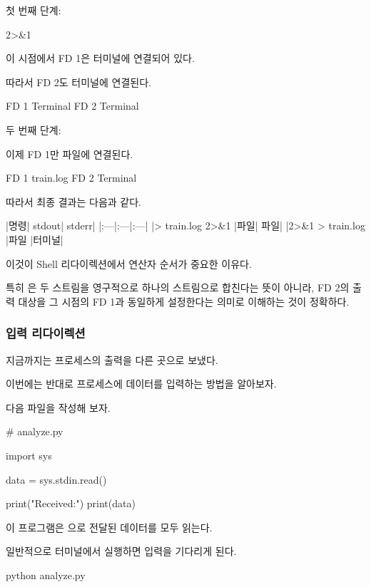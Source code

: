 첫 번째 단계:

\begin{dhkzsh}
2>&1
\end{dhkzsh}

이 시점에서 FD 1은 터미널에 연결되어 있다.

따라서 FD 2도 터미널에 연결된다.

\begin{dhksmry}
FD 1 \ra Terminal
FD 2 \ra Terminal
\end{dhksmry}

두 번째 단계:

이제 FD 1만 파일에 연결된다.

\begin{dhkzsh}
FD 1 \ra train.log
FD 2 \ra Terminal
\end{dhkzsh}

따라서 최종 결과는 다음과 같다.

\begin{dhktable}
|명령|	stdout|	stderr|
|:---|:---|:---|
|> train.log 2>&1	|파일|	파일|
|2>&1 > train.log	|파일	|터미널|
\end{dhktable}

이것이 Shell 리다이렉션에서 연산자 순서가 중요한 이유다.

특히 은 두 스트림을 영구적으로 하나의 스트림으로 합친다는 뜻이 아니라, FD 2의 출력 대상을 그 시점의 FD 1과 동일하게 설정한다는 의미로 이해하는 것이 정확하다.

\subsubsection{입력 리다이렉션 \zsh{<}}

지금까지는 프로세스의 출력을 다른 곳으로 보냈다.

이번에는 반대로 프로세스에 데이터를 입력하는 방법을 알아보자.

다음 파일을 작성해 보자.

\begin{dhkcode}
# analyze.py

import sys

data = sys.stdin.read()

print("Received:")
print(data)
\end{dhkcode}

이 프로그램은 으로 전달된 데이터를 모두 읽는다.

일반적으로 터미널에서 실행하면 입력을 기다리게 된다.

\begin{dhkzsh}
python analyze.py
\end{dhkzsh}

